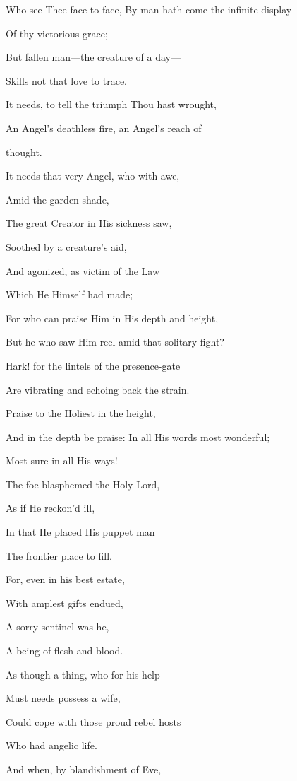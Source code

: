 Who see Thee face
to face, By man hath come the infinite display

Of thy victorious
grace;

But fallen man—the creature of a day—

Skills not that
love to trace.

It needs, to tell the triumph Thou hast wrought,

An Angel's deathless fire, an Angel's reach of

thought.

It needs that very Angel, who with awe,

Amid the garden
shade,

The great Creator in His sickness saw,

Soothed by a
creature's aid,

And agonized, as victim of the Law

Which He Himself
had made;

For who can praise Him in His depth and height,

But he who saw Him reel amid that solitary fight?


Hark! for the lintels of the presence-gate

Are vibrating and echoing back the strain.


Praise to
the Holiest in the height,

And in the depth be praise: In all
His words most wonderful;

Most sure in all His ways!

The foe
blasphemed the Holy Lord,

As if He reckon'd ill,

In that
He placed His puppet man

The frontier place to fill.

For, even
in his best estate,

With amplest gifts endued,

A sorry
sentinel was he,

A being of flesh and blood.

As though
a thing, who for his help

Must needs possess a wife,

Could
cope with those proud rebel hosts

Who had angelic life.

And when,
by blandishment of Eve,

